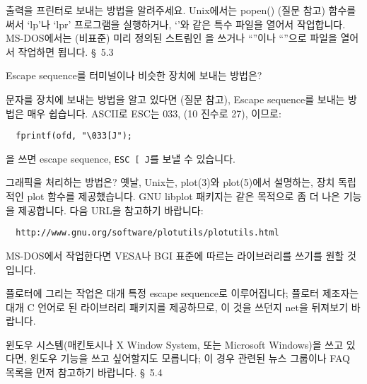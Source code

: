 \begin{faq}
	출력을 프린터로 보내는 방법을 알려주세요.
\A
	Unix에서는 popen() (질문  참고) 함수를 써서 `lp'나 `lpr'
	프로그램을 실행하거나, `'와 같은 특수 파일을 열어서
	작업합니다.  MS-DOS에서는 (비표준) 미리 정의된 스트림인
	을 쓰거나 ``''이나 ``''으로
	파일을 열어서 작업하면 됩니다.
\R
	\cite{pcs} \S\ 5.3 
\end{faq}

\begin{faq}
	Escape sequence를 터미널이나 비슷한 장치에 보내는 방법은?

\A
	문자를 장치에 보내는 방법을 알고 있다면 (질문  참고),
	Escape sequence를 보내는 방법은 매우 쉽습니다.
	ASCII로 ESC는 033, (10 진수로 27), 이므로:

\begin{verbatim}
  fprintf(ofd, "\033[J");
\end{verbatim}
	을 쓰면 escape sequence, \verb+ESC [ J+를 보낼 수 있습니다.
\end{faq}

\begin{faq}
	그래픽을 처리하는 방법은?
\A
	옛날, Unix는, plot(3)와 plot(5)에서 설명하는, 장치 독립적인 plot
	함수를 제공했습니다.  GNU libplot 패키지는 같은 목적으로 
	좀 더 나은 기능을 제공합니다.  다음 URL을 참고하기 바랍니다:

\begin{verbatim}
  http://www.gnu.org/software/plotutils/plotutils.html
\end{verbatim}

	MS-DOS에서 작업한다면 VESA나 BGI 표준에 따르는 라이브러리를
	쓰기를 원할 것입니다.

	플로터에 그리는 작업은 대개 특정 escape sequence로 이루어집니다;
	플로터 제조자는 대개 C 언어로 된 라이브러리 패키지를 제공하므로,
	이 것을 쓰던지 net을 뒤져보기 바랍니다.

	윈도우 시스템(매킨토시나 X Window System, 또는 Microsoft Windows)을
	쓰고 있다면, 윈도우 기능을 쓰고 싶어할지도 모릅니다;
	이 경우 관련된 뉴스 그룹이나 FAQ 목록을 먼저 참고하기 바랍니다.
\R
	\cite{pcs} \S\ 5.4 
\end{faq}


